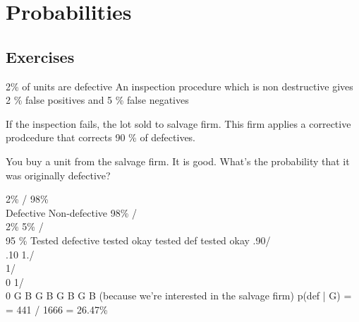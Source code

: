 \documentclass[9pt, letterpaper, oneside]{article}
\begin{document}
\section{Probabilities}
\subsection{Exercises}

2\% of units are defective
An inspection procedure which is non destructive gives 2 \% false positives and 5 \% false negatives

If the inspection fails, the lot sold to salvage firm. This firm applies a corrective prodcedure that corrects 90 \% of defectives.

You buy a unit from the salvage firm. It is good. What's the probability that it was originally defective?

								2\%	/                                   98\%     \\
								  Defective				Non-defective
							98\%	  /             \\ 2\%                         5\% /                  \\ 95 \%
					Tested defective	     tested okay          tested def                     tested okay
					.90/			\\.10		1./	\\		1/	\\0			1/	\\0
					G			B		G	B		G	B			G	B
										(because we're interested in the salvage firm)	
p(def | G) =  = 441 / 1666 = 26.47\%
										
										
\end{document}
